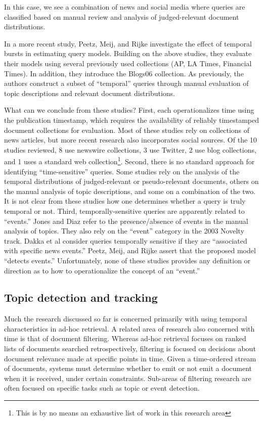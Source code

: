 \documentclass{sig-alternate}
\begin{document}
In this case, we see a combination of news and social media where queries are classified based on manual review and analysis of judged-relevant document distributions.

In a more recent study, Peetz, Meij, and Rijke \cite{Peetz2013} investigate the effect of temporal bursts in estimating query models. Building on the above studies, they evaluate their models using several previously used collections (AP, LA Times, Financial Times). In addition, they introduce the Blogs06 collection.  As previously, the authors construct a subset of ``temporal'' queries through manual evaluation of topic descriptions and relevant document distributions. 

What can we conclude from these studies? First, each operationalizes time using the publication timestamp, which requires the availability of reliably timestamped document collections for evaluation.  Most of these studies rely on collections of news articles, but more recent research also incorporates social sources. Of the 10 studies reviewed, 8 use newswire collections, 3 use Twitter, 2 use blog collections, and 1 uses a standard web collection\footnote{This is by no means an exhaustive list of work in this research area}.  Second, there is no standard approach for identifying ``time-sensitive'' queries. Some studies rely on the analysis of the temporal distributions of judged-relevant or pseudo-relevant documents, others on the manual analysis of topic descriptions, and some on a combination of the two.  It is not clear from these studies how one determines whether a query is truly temporal or not.  Third, temporally-sensitive queries are apparently related to ``events.'' Jones and Diaz refer to the presence/absence of events in the manual analysis of topics. They also rely on the ``event'' category in the 2003 Novelty track.  Dakka et al consider queries temporally sensitive if they are ``associated with specific news events.''  Peetz, Meij, and Rijke assert that the proposed model ``detects events.''  Unfortunately, none of these studies provides any definition or direction as to how to operationalize the concept of an ``event.''

\subsection{Topic detection and tracking}

Much the research discussed so far is concerned primarily with using temporal characteristics in ad-hoc retrieval. A related area of research also concerned with time is that of document filtering. Whereas ad-hoc retrieval focuses on ranked lists of documents searched retrospectively, filtering is focused on decisions about document relevance made at specific points in time. Given a time-ordered stream of documents, systems must determine whether to emit or not emit a document when it is received, under certain constraints.  Sub-areas of filtering research are often focused on specific tasks such as topic or event detection. 
\end{document}
